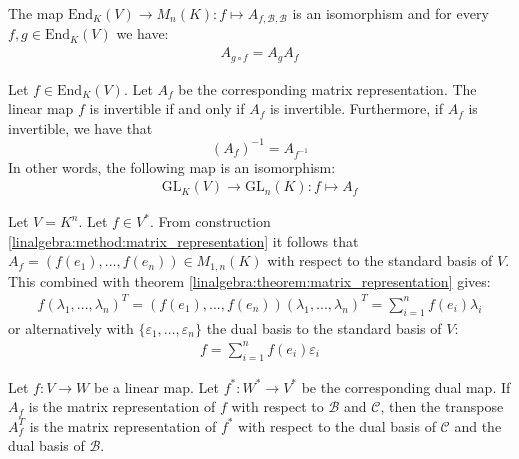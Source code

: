 	\begin{theorem}\label{linalgebra:theorem:matrix_composition_end}
	        The map $\text{End}_K(V)\rightarrow M_n(K):f\mapsto A_{f, \mathcal{B}, \mathcal{B}}$ is an isomorphism and for every $f,g\in\text{End}_K(V)$ we have:
        	\begin{gather}
			A_{g\circ f} = A_gA_f
		\end{gather}
	\end{theorem}
	
        \begin{theorem}\label{linalgebra:matrix_invertable_map}
	        Let $f\in\text{End}_K(V)$. Let $A_f$ be the corresponding matrix representation. The linear map $f$ is invertible if and only if $A_f$ is invertible. Furthermore, if $A_f$ is invertible, we have that \[\left(A_f\right)^{-1} = A_{f^{-1}}\] In other words, the following map is an isomorphism\footnotemark:
	        \begin{gather}
	        	\text{GL}_K(V)\rightarrow\text{GL}_n(K):f\mapsto A_f
	        \end{gather}
	\end{theorem}
        
        \begin{theorem}
		Let $V = K^n$. Let $f\in V^*$. From construction \ref{linalgebra:method:matrix_representation} it follows that $A_f = (f(e_1), ..., f(e_n))\in M_{1,n}(K)$ with respect to the standard basis of $V$. This combined with theorem \ref{linalgebra:theorem:matrix_representation} gives:
	        \begin{gather}
			f(\lambda_1, ..., \lambda_n)^T = (f(e_1), ..., f(e_n))(\lambda_1, ..., \lambda_n)^T = \sum_{i=1}^nf(e_i)\lambda_i
		\end{gather}
        	or alternatively with $\{\varepsilon_1, ..., \varepsilon_n\}$ the dual basis to the standard basis of $V$:
	        \begin{gather}
        	    	\label{linalgebra:map_in_function_of_dual_basis}
			\boxed{f = \sum_{i=1}^nf(e_i)\varepsilon_i}
		\end{gather}
	\end{theorem}
        
        \begin{theorem}
		Let $f:V\rightarrow W$ be a linear map. Let $f^*:W^*\rightarrow V^*$ be the corresponding dual map. If $A_f$ is the matrix representation of $f$ with respect to $\mathcal{B}$ and $\mathcal{C}$, then the transpose $A_f^T$ is the matrix representation of $f^*$ with respect to the dual basis of $\mathcal{C}$ and the dual basis of $\mathcal{B}$.
	\end{theorem}
        
